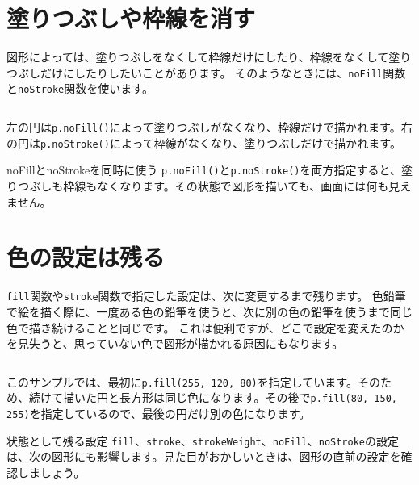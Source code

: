 \section{塗りつぶしや枠線を消す}

図形によっては、塗りつぶしをなくして枠線だけにしたり、枠線をなくして塗りつぶしだけにしたりしたいことがあります。
そのようなときには、\texttt{noFill}関数と\texttt{noStroke}関数を使います。

\begin{listing}[htbp]
\inputminted{ts}{typescript-p5/listings/chapter03/no-fill-and-no-stroke.ts}
\caption{塗りつぶしや枠線を消す（\texttt{chapter03/no-fill-and-no-stroke.ts}）}
\label{lst:chapter03-no-fill-and-no-stroke}
\end{listing}

左の円は\texttt{p.noFill()}によって塗りつぶしがなくなり、枠線だけで描かれます。右の円は\texttt{p.noStroke()}によって枠線がなくなり、塗りつぶしだけで描かれます。

\begin{mistakebox}{noFillとnoStrokeを同時に使う}
\texttt{p.noFill()}と\texttt{p.noStroke()}を両方指定すると、塗りつぶしも枠線もなくなります。その状態で図形を描いても、画面には何も見えません。
\end{mistakebox}

\section{色の設定は残る}

\texttt{fill}関数や\texttt{stroke}関数で指定した設定は、次に変更するまで残ります。
色鉛筆で絵を描く際に、一度ある色の鉛筆を使うと、次に別の色の鉛筆を使うまで同じ色で描き続けることと同じです。
これは便利ですが、どこで設定を変えたのかを見失うと、思っていない色で図形が描かれる原因にもなります。

\begin{listing}[htbp]
\inputminted{ts}{typescript-p5/listings/chapter03/color-state.ts}
\caption{色の設定が次の図形にも使われる例（\texttt{chapter03/color-state.ts}）}
\label{lst:chapter03-color-state}
\end{listing}

このサンプルでは、最初に\texttt{p.fill(255, 120, 80)}を指定しています。そのため、続けて描いた円と長方形は同じ色になります。その後で\texttt{p.fill(80, 150, 255)}を指定しているので、最後の円だけ別の色になります。

\begin{pointbox}{状態として残る設定}
\texttt{fill}、\texttt{stroke}、\texttt{strokeWeight}、\texttt{noFill}、\texttt{noStroke}の設定は、次の図形にも影響します。見た目がおかしいときは、図形の直前の設定を確認しましょう。
\end{pointbox}

